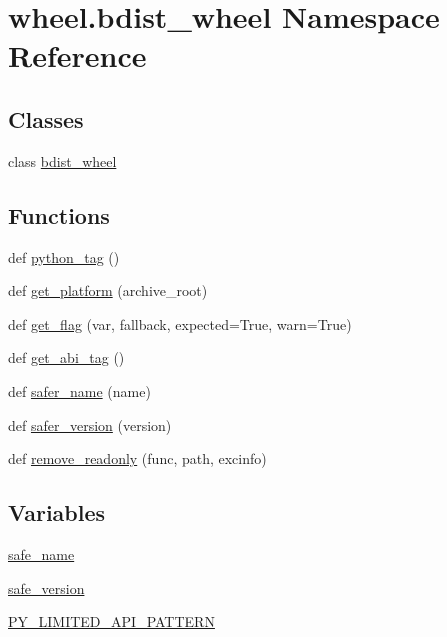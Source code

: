 \hypertarget{namespacewheel_1_1bdist__wheel}{}\section{wheel.\+bdist\+\_\+wheel Namespace Reference}
\label{namespacewheel_1_1bdist__wheel}
\subsection*{Classes}
\begin{DoxyCompactItemize}
\item 
class \hyperlink{classwheel_1_1bdist__wheel_1_1bdist__wheel}{bdist\+\_\+wheel}
\end{DoxyCompactItemize}
\subsection*{Functions}
\begin{DoxyCompactItemize}
\item 
def \hyperlink{namespacewheel_1_1bdist__wheel_abfd7e653d6f0bf0130d7b8775b9ba27e}{python\+\_\+tag} ()
\item 
def \hyperlink{namespacewheel_1_1bdist__wheel_aa327aba8fe11c2c8c8bf04093b9d0d96}{get\+\_\+platform} (archive\+\_\+root)
\item 
def \hyperlink{namespacewheel_1_1bdist__wheel_ad78961082011fad391e05a61a9e67a3b}{get\+\_\+flag} (var, fallback, expected=True, warn=True)
\item 
def \hyperlink{namespacewheel_1_1bdist__wheel_a6eb23762f46bbd118ec204d9aa5bc875}{get\+\_\+abi\+\_\+tag} ()
\item 
def \hyperlink{namespacewheel_1_1bdist__wheel_aeae02a8cd1a921eb5d388ae30791711d}{safer\+\_\+name} (name)
\item 
def \hyperlink{namespacewheel_1_1bdist__wheel_a4af993e7621146af0469af1519de205d}{safer\+\_\+version} (version)
\item 
def \hyperlink{namespacewheel_1_1bdist__wheel_a6ae0a4a0c313d1abf67df73ab6f921f2}{remove\+\_\+readonly} (func, path, excinfo)
\end{DoxyCompactItemize}
\subsection*{Variables}
\begin{DoxyCompactItemize}
\item 
\hyperlink{namespacewheel_1_1bdist__wheel_a8790f4863c5ddc8bfaa0113d7f59d3d4}{safe\+\_\+name}
\item 
\hyperlink{namespacewheel_1_1bdist__wheel_a7a190b73600dedd30095d57645b520bd}{safe\+\_\+version}
\item 
\hyperlink{namespacewheel_1_1bdist__wheel_a28201c7992bcfdde7b323a7d0cbebfbb}{P\+Y\+\_\+\+L\+I\+M\+I\+T\+E\+D\+\_\+\+A\+P\+I\+\_\+\+P\+A\+T\+T\+E\+RN}
\end{DoxyCompactItemize}


